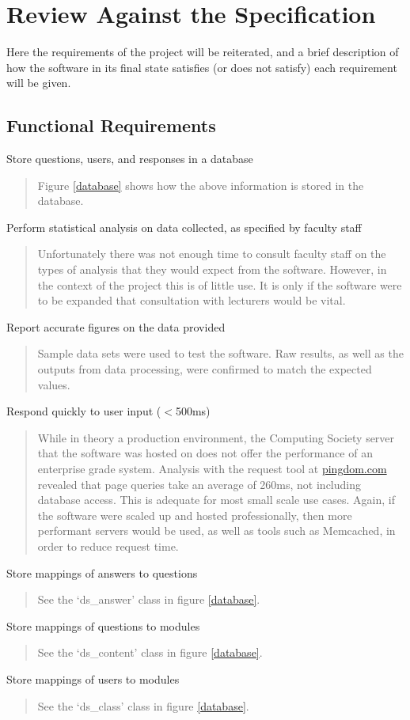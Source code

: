\documentclass[12pt,a4paper,twoside]{report}
\begin{document}
\section{Review Against the Specification}
Here the requirements of the project will be reiterated, and a brief description of how the software in its final state satisfies (or does not satisfy) each requirement will be given.

\subsection{Functional Requirements}
Store questions, users, and responses in a database
\begin{quote}
Figure \ref{database} shows how the above information is stored in the database.
\end{quote}
Perform statistical analysis on data collected, as specified by faculty staff
\begin{quote}
Unfortunately there was not enough time to consult faculty staff on the types of analysis that they would expect from the software. However, in the context of the project this is of little use. It is only if the software were to be expanded that consultation with lecturers would be vital.
\end{quote}
Report accurate figures on the data provided
\begin{quote}
Sample data sets were used to test the software. Raw results, as well as the outputs from data processing, were confirmed to match the expected values.
\end{quote}
Respond quickly to user input ($<$500ms)
\begin{quote}
While in theory a production environment, the Computing Society server that the software was hosted on does not offer the performance of an enterprise grade system. Analysis with the request tool at \url{pingdom.com} revealed that page queries take an average of 260ms, not including database access. This is adequate for most small scale use cases. Again, if the software were scaled up and hosted professionally, then more performant servers would be used, as well as tools such as Memcached, in order to reduce request time. 
\end{quote}
Store mappings of answers to questions
\begin{quote}
See the `ds\_answer' class in figure \ref{database}.
\end{quote}
Store mappings of questions to modules
\begin{quote}
See the `ds\_content' class in figure \ref{database}.
\end{quote}
Store mappings of users to modules
\begin{quote}
See the `ds\_class' class in figure \ref{database}.
\end{quote}
\end{document}
